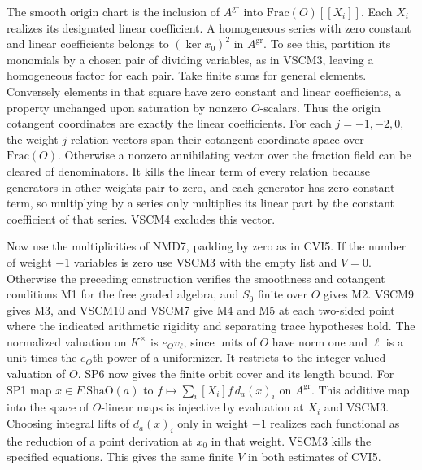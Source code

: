 The smooth origin chart is the inclusion of $A^{\mathrm{gr}}$ into
$\mathrm{Frac}(O)[[X_i]]$. Each $X_i$ realizes its designated
linear coefficient. A homogeneous series with zero constant and
linear coefficients belongs to $(\ker x_0)^2$ in $A^{\mathrm{gr}}$. To see this, partition its monomials by a chosen pair of dividing variables, as
in VSCM3, leaving a homogeneous factor for each pair. Take finite
sums for general elements. Conversely elements in that square
have zero constant and linear coefficients, a property unchanged
upon saturation by nonzero $O$-scalars. Thus the origin cotangent
coordinates are exactly the linear coefficients. For each
$j=-1,-2,0$, the weight-$j$ relation vectors span their cotangent
coordinate space over $\mathrm{Frac}(O)$. Otherwise a nonzero
annihilating vector over the fraction field can be cleared of
denominators. It kills the linear term of every relation because generators
in other weights pair to zero, and each generator has zero constant
term, so multiplying by a series only multiplies its linear part by
the constant coefficient of that series. VSCM4 excludes this vector.

Now use the multiplicities of NMD7, padding by zero as in CVI5.
If the number of weight $-1$ variables is zero use VSCM3 with the
empty list and $V=0$. Otherwise the preceding construction verifies
the smoothness and cotangent conditions M1 for the free graded
algebra, and $S_0$ finite over $O$ gives M2. VSCM9 gives M3, and VSCM10
and VSCM7 give M4 and M5 at each two-sided point where the indicated
arithmetic rigidity and separating trace hypotheses hold.
The normalized valuation on $K^\times$ is $e_Ov_\ell$, since units
of $O$ have norm one and $\ell$ is a unit times the $e_O$th
power of a uniformizer. It restricts to the integer-valued
valuation of $O$. SP6 now gives the finite orbit cover and its
length bound. For SP1 map $x\in F.\mathrm{ShaO}(a)$ to
$f\mapsto\sum_i [X_i]f\,d_a(x)_i$ on $A^{\mathrm{gr}}$. This
additive map into the space of $O$-linear maps is injective by
evaluation at $X_i$ and VSCM3. Choosing integral lifts of $d_a(x)_i$
only in weight $-1$ realizes each functional as the reduction of
a point derivation at $x_0$ in that weight. VSCM3 kills the specified
equations. This gives the same finite $V$ in both estimates of CVI5.
